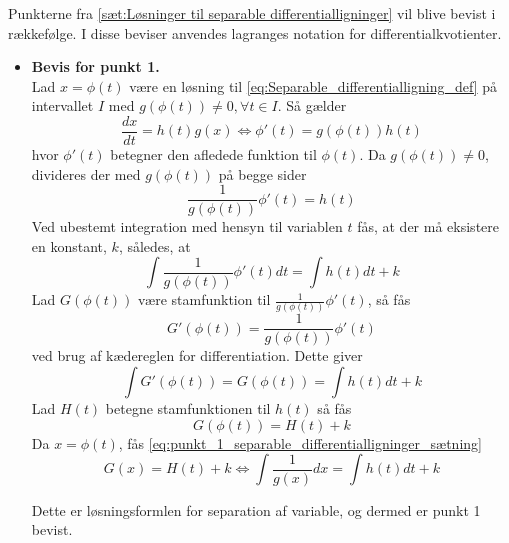 \begin{bev}
    Punkterne fra \autoref{sæt:Løsninger til separable differentialligninger} vil blive bevist i rækkefølge. I disse beviser anvendes lagranges notation for differentialkvotienter.
    
    \begin{itemize}
        \item[] \textbf{Bevis for punkt 1.}\\ 
            Lad $x = \phi(t)$ være en løsning til \eqref{eq:Separable_differentialligning_def} på intervallet $I$ med $g\left(\phi(t)\right) \neq 0, \forall t\in I$. Så gælder
            $$ \frac{dx}{dt} = h(t)g(x) \Leftrightarrow \phi'(t) = g\left(\phi(t)\right) h(t) $$
            hvor $\phi'(t)$ betegner den afledede funktion til $\phi(t)$. Da $g\left(\phi(t)\right) \neq 0$, divideres der med $g\left(\phi(t)\right)$ på begge sider
            $$ \frac{1}{g\left(\phi(t)\right)} \phi'(t) = h(t) $$
            Ved ubestemt integration med hensyn til variablen $t$ fås, at der må eksistere en konstant, $k$, således, at
            $$ \int \frac{1}{g\left(\phi(t)\right)} \phi'(t) dt  = \int h(t) dt + k $$
            Lad $G(\phi(t))$ være stamfunktion til $\frac{1}{g(\phi(t))}\phi'(t)$, så fås
            $$ G'(\phi(t)) = \frac{1}{g(\phi(t))} \phi'(t) $$ 
            ved brug af kædereglen for differentiation. Dette giver
            $$ \int G'(\phi(t)) = G(\phi(t)) = \int h(t) dt + k $$
            Lad $H(t)$ betegne stamfunktionen til $h(t)$ så fås
            $$ G(\phi(t)) = H(t) + k $$
            Da $x = \phi(t)$, fås \ref{eq:punkt_1_separable_differentialligninger_sætning}
            $$ G(x) = H(t) + k \Leftrightarrow\int \frac{1}{g(x)} dx = \int h(t) dt + k $$
        
        Dette er løsningsformlen for separation af variable, og dermed er punkt 1 bevist. 


\end{itemize}
\end{bev}
